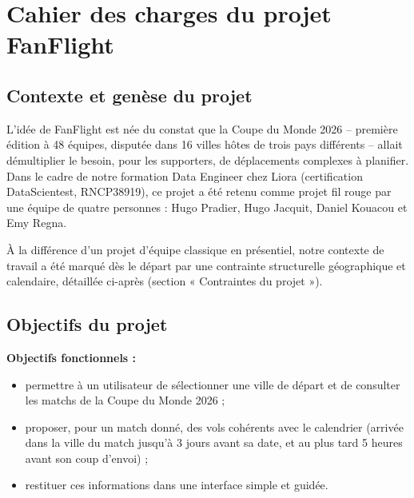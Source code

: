 \documentclass[11pt,a4paper]{report}
\begin{document}
\chapter{Cahier des charges du projet FanFlight}
\label{chap:cahier}

\section{Contexte et genèse du projet}

L'idée de FanFlight est née du constat que la Coupe du Monde 2026 -- première édition à 48 équipes, disputée dans 16 villes hôtes de trois pays différents -- allait démultiplier le besoin, pour les supporters, de déplacements complexes à planifier. Dans le cadre de notre formation Data Engineer chez Liora (certification DataScientest, RNCP38919), ce projet a été retenu comme projet fil rouge par une équipe de quatre personnes : Hugo Pradier, Hugo Jacquit, Daniel Kouacou et Emy Regna.

À la différence d'un projet d'équipe classique en présentiel, notre contexte de travail a été marqué dès le départ par une contrainte structurelle géographique et calendaire, détaillée ci-après (section « Contraintes du projet »).

\section{Objectifs du projet}

\textbf{Objectifs fonctionnels :}
\begin{itemize}
  \item permettre à un utilisateur de sélectionner une ville de départ et de consulter les matchs de la Coupe du Monde 2026 ;
  \item proposer, pour un match donné, des vols cohérents avec le calendrier (arrivée dans la ville du match jusqu'à 3 jours avant sa date, et au plus tard 5 heures avant son coup d'envoi) ;
  \item restituer ces informations dans une interface simple et guidée.
\end{itemize}
\end{document}
